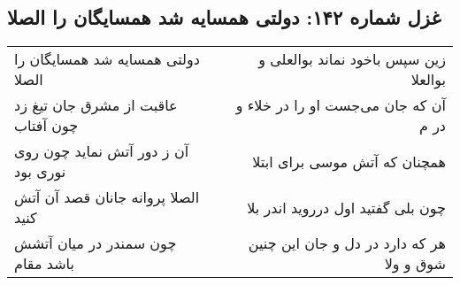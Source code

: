 \begin{center}
\section*{غزل شماره ۱۴۲: دولتی همسایه شد همسایگان را الصلا}
\label{sec:0142}
\begin{longtable}{l p{0.5cm} r}
دولتی همسایه شد همسایگان را الصلا
&&
زین سپس باخود نماند بوالعلی و بوالعلا
\\
عاقبت از مشرق جان تیغ زد چون آفتاب
&&
آن که جان می‌جست او را در خلاء و در م
\\
آن ز دور آتش نماید چون روی نوری بود
&&
همچنان که آتش موسی برای ابتلا
\\
الصلا پروانه جانان قصد آن آتش کنید
&&
چون بلی گفتید اول درروید اندر بلا
\\
چون سمندر در میان آتشش باشد مقام
&&
هر که دارد در دل و جان این چنین شوق و ولا
\\
\end{longtable}
\end{center}
